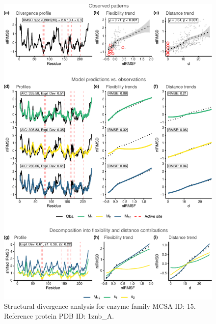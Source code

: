 \documentclass[
]{article}
\begin{document}
\clearpage
\begin{figure}[H]
\centering


\begin{center}\includegraphics{supplementary_material_files/figure-latex/generate_figures-2} \end{center}

\caption{Structural divergence analysis for enzyme family MCSA ID: 15. Reference protein PDB ID: 1znb\_A.}
\end{figure}
\end{document}
